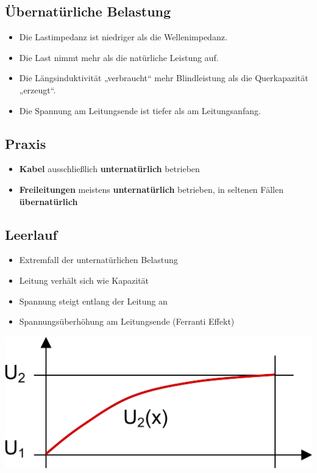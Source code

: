 \subsection{Übernatürliche Belastung}

\begin{itemize}
    \item Die Lastimpedanz ist niedriger als die Wellenimpedanz.
    \item Die Last nimmt mehr als die natürliche Leistung auf.
    \item Die Längsinduktivität „verbraucht“ mehr Blindleistung als die Quer­kapazität „erzeugt“.
    \item Die Spannung am Leitungsende ist tiefer als am Leitungsanfang.
\end{itemize}


\subsection{Praxis}

\begin{itemize}
    \item \textbf{Kabel} ausschließlich \textbf{unternatürlich} betrieben
    \item \textbf{Freileitungen} meistens \textbf{unternatürlich} betrieben, in seltenen Fällen \textbf{übernatürlich}
\end{itemize}


\subsection{Leerlauf}

\begin{itemize}
    \item Extremfall der unternatürlichen Belastung
    \item Leitung verhält sich wie Kapazität
    \item Spannung steigt entlang der Leitung an
    \item Spannungsüberhöhung am Leitungsende (Ferranti Effekt)
\end{itemize}

\vspace{0.15cm}

\includegraphics[width=0.55\columnwidth, align=c]{images/Leerlauf.png}

